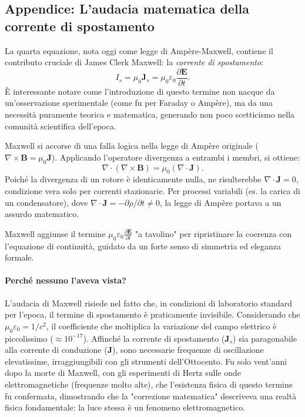 \documentclass[a4paper,11pt]{report}
\begin{document}
\subsection{Appendice: L'audacia matematica della corrente di spostamento}

La quarta equazione, nota oggi come legge di Ampère-Maxwell, contiene il contributo cruciale di James Clerk Maxwell: la \textit{corrente di spostamento}:
\begin{equation}
I_s = \mu_0\bm{J}_s = \mu_0\varepsilon_0 \frac{\partial \bm{E}}{\partial t}.
\end{equation}
È interessante notare come l'introduzione di questo termine non nacque da un'osservazione sperimentale (come fu per Faraday o Ampère), ma da una necessità puramente teorica e matematica, generando non poco scetticismo nella comunità scientifica dell'epoca.

\begin{tcolorbox}[colback=gray!10, colframe=black!70, title=Il "paradosso" e la simmetria mancante]
    Maxwell si accorse di una falla logica nella legge di Ampère originale ($\nabla \times \bm{B} = \mu_0 \bm{J}$). Applicando l'operatore divergenza a entrambi i membri, si ottiene:
    \[ \nabla \cdot (\nabla \times \bm{B}) = \mu_0 (\nabla \cdot \bm{J}). \]
    Poiché la divergenza di un rotore è identicamente nulla, ne risulterebbe $\nabla \cdot \bm{J} = 0$, condizione vera solo per correnti stazionarie. Per processi variabili (es. la carica di un condensatore), dove $\nabla \cdot \bm{J} = -\partial \rho/\partial t \neq 0$, la legge di Ampère portava a un assurdo matematico.
    
    Maxwell aggiunse il termine $\mu_0\varepsilon_0 \frac{\partial \bm{E}}{\partial t}$ "a tavolino" per ripristinare la coerenza con l'equazione di continuità, guidato da un forte senso di simmetria ed eleganza formale.
\end{tcolorbox}



\paragraph{Perché nessuno l'aveva vista?}
L'audacia di Maxwell risiede nel fatto che, in condizioni di laboratorio standard per l'epoca, il termine di spostamento è praticamente invisibile.
Considerando che $\mu_0\varepsilon_0 = 1/c^2$, il coefficiente che moltiplica la variazione del campo elettrico è piccolissimo ($\approx 10^{-17}$).
Affinché la corrente di spostamento ($\bm{J}_s$) sia paragonabile alla corrente di conduzione ($\bm{J}$), sono necessarie frequenze di oscillazione elevatissime, irraggiungibili con gli strumenti dell'Ottocento.
Fu solo vent'anni dopo la morte di Maxwell, con gli esperimenti di Hertz sulle onde elettromagnetiche (frequenze molto alte), che l'esistenza fisica di questo termine fu confermata, dimostrando che la "correzione matematica" descriveva una realtà fisica fondamentale: la luce stessa è un fenomeno elettromagnetico.
\end{document}

